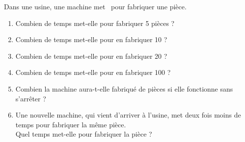 \begin{exercice}
    Dans une usine, une machine met \, pour fabriquer une pièce.
    \begin{enumerate}
       \item Combien de temps met-elle pour fabriquer 5 pièces ?
       \item Combien de temps met-elle pour en fabriquer 10 ?
       \item Combien de temps met-elle pour en fabriquer 20 ?
       \item Combien de temps met-elle pour en fabriquer 100 ?
       \item Combien la machine aura-t-elle fabriqué de pièces si elle fonctionne  sans s’arrêter ?
       \item Une nouvelle machine, qui vient d’arriver à l’usine, met deux fois moins de temps pour fabriquer la même pièce. \\
       Quel temps met-elle pour fabriquer la pièce ?
    \end{enumerate}
 \end{exercice}

